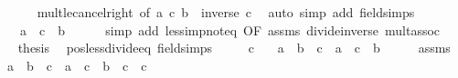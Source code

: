 \begin{isabellebody}
\ \ \ \ \isamarkupfalse%
\ mult{\isacharunderscore}{\kern0pt}le{\isacharunderscore}{\kern0pt}cancel{\isacharunderscore}{\kern0pt}right\ {\isacharbrackleft}{\kern0pt}of\ a\ c\ {\isachardoublequoteopen}b\ {\isacharasterisk}{\kern0pt}\ inverse\ c{\isachardoublequoteclose}{\isacharbrackright}{\kern0pt}\ \isamarkupfalse%
\ {\isacharparenleft}{\kern0pt}auto\ simp\ add{\isacharcolon}{\kern0pt}\ field{\isacharunderscore}{\kern0pt}simps{\isacharparenright}{\kern0pt}\isanewline
\ \ \isamarkupfalse%
\ \isamarkupfalse%
\ {\isachardoublequoteopen}{\isachardot}{\kern0pt}{\isachardot}{\kern0pt}{\isachardot}{\kern0pt}\ {\isasymlongleftrightarrow}\ a\ {\isacharasterisk}{\kern0pt}\ c\ {\isasymle}\ b{\isachardoublequoteclose}\isanewline
\ \ \ \ \isamarkupfalse%
\ {\isacharparenleft}{\kern0pt}simp\ add{\isacharcolon}{\kern0pt}\ less{\isacharunderscore}{\kern0pt}imp{\isacharunderscore}{\kern0pt}not{\isacharunderscore}{\kern0pt}eq{}\ {\isacharbrackleft}{\kern0pt}OF\ assms{\isacharbrackright}{\kern0pt}\ divide{\isacharunderscore}{\kern0pt}inverse\ mult{\isachardot}{\kern0pt}assoc{\isacharparenright}{\kern0pt}\isanewline
\ \ \isamarkupfalse%
\ \isamarkupfalse%
\ {\isacharquery}{\kern0pt}thesis\ \isacommand{{\isachardot}{\kern0pt}}\isamarkupfalse%
\isanewline
{}\isamarkupfalse%
%
\endisatagproof
{\isafoldproof}%
%
\isadelimproof
\isanewline
%
\endisadelimproof
\isanewline
{}\isamarkupfalse%
\ pos{\isacharunderscore}{\kern0pt}less{\isacharunderscore}{\kern0pt}divide{\isacharunderscore}{\kern0pt}eq\ {\isacharbrackleft}{\kern0pt}field{\isacharunderscore}{\kern0pt}simps{\isacharbrackright}{\kern0pt}{\isacharcolon}{\kern0pt}\isanewline
\ \ \ {\isachardoublequoteopen}{}\ {\isacharless}{\kern0pt}\ c{\isachardoublequoteclose}\isanewline
\ \ \ {\isachardoublequoteopen}a\ {\isacharless}{\kern0pt}\ b\ {\isacharslash}{\kern0pt}\ c\ {\isasymlongleftrightarrow}\ a\ {\isacharasterisk}{\kern0pt}\ c\ {\isacharless}{\kern0pt}\ b{\isachardoublequoteclose}\isanewline
%
\isadelimproof
%
\endisadelimproof
%
\isatagproof
{}\isamarkupfalse%
\ {\isacharminus}{\kern0pt}\isanewline
\ \ \isamarkupfalse%
\ assms\ \isamarkupfalse%
\ {\isachardoublequoteopen}a\ {\isacharless}{\kern0pt}\ b\ {\isacharslash}{\kern0pt}\ c\ {\isasymlongleftrightarrow}\ a\ {\isacharasterisk}{\kern0pt}\ c\ {\isacharless}{\kern0pt}\ {\isacharparenleft}{\kern0pt}b\ {\isacharslash}{\kern0pt}\ c{\isacharparenright}{\kern0pt}\ {\isacharasterisk}{\kern0pt}\ c{\isachardoublequoteclose}\isanewline

\end{isabellebody}
